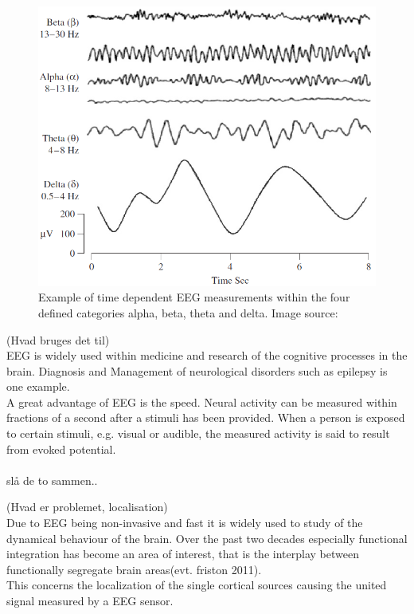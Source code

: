 \begin{figure}[h]
    \centering
    \includegraphics[scale=0.65]{figurs/EEG_example.png}
    \caption{Example of time dependent EEG measurements within the four defined categories alpha, beta, theta and delta. Image source: \cite{EEGsignalprocessing}}
    \label{fig:EEG_example}
\end{figure}

(Hvad bruges det til)\\
EEG is widely used within medicine and research of the cognitive processes in the brain. Diagnosis and Management of neurological disorders such as epilepsy is one example. \\   
A great advantage of EEG is the speed. Neural activity can be measured within fractions of a second after a stimuli has been provided\cite[p. 3]{fundamentalEEG}. When a person is exposed to certain stimuli, e.g. visual or audible, the measured activity is said to result from evoked potential.\\
\\
slå de to sammen..

(Hvad er problemet, localisation)\\
Due to EEG being non-invasive and fast it is widely used to study of the dynamical behaviour of the brain. Over the past two decades especially functional integration has become an area of interest, that is the interplay between functionally segregate brain areas\cite{Van2019}(evt. friston 2011).  \\
This concerns the localization of the single cortical sources causing the united signal measured by a EEG sensor.\\ 
\\  

